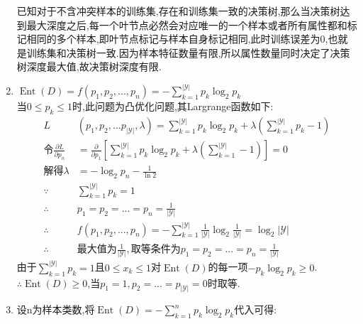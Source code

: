 \documentclass[answers]{exam}  %
\begin{document}
\begin{questions}
\begin{solution}
\begin{enumerate}
                  已知对于不含冲突样本的训练集,存在和训练集一致的决策树,那么当决策树达到最大深度之后,每一个叶节点必然会对应唯一的一个样本或者所有属性都和标记相同的多个样本,即叶节点标记与样本自身标记相同,此时训练误差为0,也就是训练集和决策树一致.因为样本特征数量有限,所以属性数量同时决定了决策树深度最大值,故决策树深度有限.
            \item $\operatorname{Ent}(D)=f(p_1,p_2,...,p_n)=-\sum_{k=1}^{ |\mathcal{Y}| }p_k\log_2 p_k$\\
                  当$0\leq p_k\leq 1$时,此问题为凸优化问题,其Largrange函数如下:
                  \begin{align*}
                      L                                   & (p_1,p_2,...p_{ |\mathcal{Y}| },\lambda )=\sum_{k=1}^{ |\mathcal{Y}| }p_k\log_2 p_k+\lambda(\sum_{k=1}^{ |\mathcal{Y}| }p_k-1)  \\
                      {令}\frac{\partial L}{\partial p_n} & =\frac{\partial}{\partial p_1}[\sum_{k=1}^{ |\mathcal{Y}| }p_k\log_2 p_k+\lambda(\sum_{k=1}^{ |\mathcal{Y}| }-1)]=0             \\
                      {解得} \lambda                      & =-\log_2 p_n-\frac{1}{\ln 2}                                                                                                    \\
                      \because                            & \sum_{k=1}^{ |\mathcal{Y}| } p_k=1                                                                                              \\
                      \therefore                          & p_1=p_2=...=p_n=\frac{1}{ |\mathcal{Y}| }                                                                                       \\
                      \therefore                          & f(p_1,p_2,...,p_n)=-\sum_{k=1}^{ |\mathcal{Y}| }\frac{1}{ |\mathcal{Y}| } \log_2\frac{1}{ |\mathcal{Y}| } =\log_2 |\mathcal{Y}| \\
                      \therefore                          & {最大值为\frac{1}{ |\mathcal{Y}| }} {,取等条件为p_1=p_2=...=p_n=\frac{1}{ |\mathcal{Y}| } }
                  \end{align*}
                  由于$\sum_{k=1}^{ |\mathcal{Y}| }p_k=1$且$0\leq x_k\leq 1$对$\operatorname{Ent}(D)$的每一项$-p_k\log_2 p_k\geq 0$.\\
                  $\therefore \operatorname{Ent}(D)\geq 0$,当$p_1=1,p_2=...=p_{ |\mathcal{Y}| }=0$时取等.
            \item 设n为样本类数,将$\operatorname{Ent}(D)=-\sum_{k=1}^{n}p_k\log_2 p_k$代入可得:


\end{enumerate}
\end{solution}
\end{questions}
\end{document}
